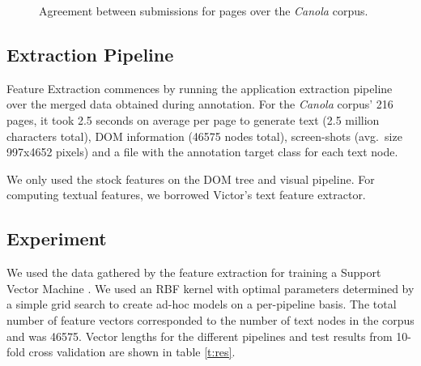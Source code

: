 \begin{figure}[h]
\centering
{}
\caption{
\label{f:merge}
\label{ens2}
	Agreement between submissions for pages over the \textit{Canola} corpus.}
\end{figure}


\subsection{Extraction Pipeline}

Feature Extraction commences by running the {\KrdWrd} application extraction pipeline over the merged data obtained during annotation. 
For the \textit{Canola} corpus' 216 pages, it took 2.5 seconds on average per page to generate text (2.5 million characters total), DOM information (46575 nodes total), screen-shots (avg.~size 997x4652 pixels) and a file with the annotation target class for each text node.

We only used the stock {\KrdWrd} features on the DOM tree and visual pipeline.
For computing textual features, we borrowed Victor's \cite{spoustamarekpecina2008} text feature extractor.

\subsection{Experiment}

We used the data gathered by the feature extraction for training a Support Vector Machine \cite{libsvm}.
We used an RBF kernel with optimal parameters determined by a simple grid search to create ad-hoc models on a per-pipeline basis.
The total number of feature vectors corresponded to the number of text nodes in the corpus and was 46575.
Vector lengths for the different pipelines and test results from 10-fold cross validation are shown in table \ref{t:res}.

